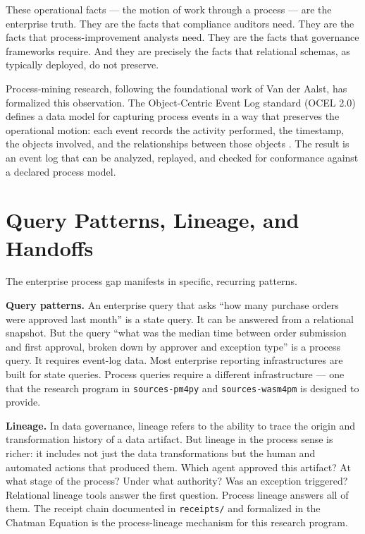 These operational facts --- the motion of work through a process --- are the enterprise truth. They are the facts that compliance auditors need. They are the facts that process-improvement analysts need. They are the facts that governance frameworks require. And they are precisely the facts that relational schemas, as typically deployed, do not preserve.

Process-mining research, following the foundational work of Van der Aalst, has formalized this observation. The Object-Centric Event Log standard (OCEL 2.0) defines a data model for capturing process events in a way that preserves the operational motion: each event records the activity performed, the timestamp, the objects involved, and the relationships between those objects \cite{vanderaalst2022ocel}. The result is an event log that can be analyzed, replayed, and checked for conformance against a declared process model.

\section{Query Patterns, Lineage, and Handoffs}

The enterprise process gap manifests in specific, recurring patterns.

\textbf{Query patterns.} An enterprise query that asks ``how many purchase orders were approved last month'' is a state query. It can be answered from a relational snapshot. But the query ``what was the median time between order submission and first approval, broken down by approver and exception type'' is a process query. It requires event-log data. Most enterprise reporting infrastructures are built for state queries. Process queries require a different infrastructure --- one that the research program in \texttt{sources-pm4py} and \texttt{sources-wasm4pm} is designed to provide.

\textbf{Lineage.} In data governance, lineage refers to the ability to trace the origin and transformation history of a data artifact. But lineage in the process sense is richer: it includes not just the data transformations but the human and automated actions that produced them. Which agent approved this artifact? At what stage of the process? Under what authority? Was an exception triggered? Relational lineage tools answer the first question. Process lineage answers all of them. The receipt chain documented in \texttt{receipts/} and formalized in the Chatman Equation is the process-lineage mechanism for this research program.

